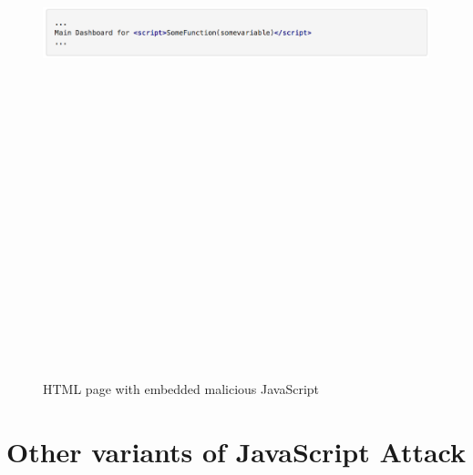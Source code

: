 \bigskip

\begin{figure}[htb]
\centering
\includegraphics[width=16cm,height=20cm,keepaspectratio]{image/dxss4.png}
\caption[HTML page with embedded malicious JavaScript]{HTML page with embedded malicious JavaScript ~\cite{g20}} 
\label{fig:dxss4}
\end{figure}

\bigskip

\section{Other variants of JavaScript Attack}

